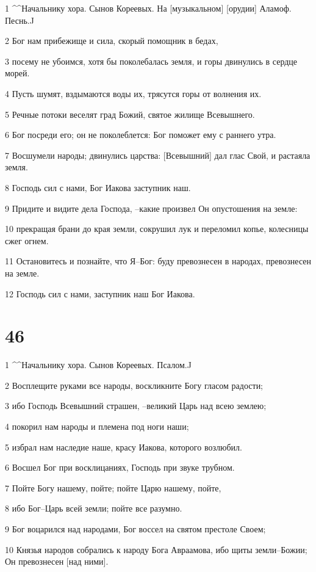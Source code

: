 \par 1 ^^Начальнику хора. Сынов Кореевых. На [музыкальном] [орудии] Аламоф. Песнь.^^
\par 2 Бог нам прибежище и сила, скорый помощник в бедах,
\par 3 посему не убоимся, хотя бы поколебалась земля, и горы двинулись в сердце морей.
\par 4 Пусть шумят, вздымаются воды их, трясутся горы от волнения их.
\par 5 Речные потоки веселят град Божий, святое жилище Всевышнего.
\par 6 Бог посреди его; он не поколеблется: Бог поможет ему с раннего утра.
\par 7 Восшумели народы; двинулись царства: [Всевышний] дал глас Свой, и растаяла земля.
\par 8 Господь сил с нами, Бог Иакова заступник наш.
\par 9 Придите и видите дела Господа, --какие произвел Он опустошения на земле:
\par 10 прекращая брани до края земли, сокрушил лук и переломил копье, колесницы сжег огнем.
\par 11 Остановитесь и познайте, что Я--Бог: буду превознесен в народах, превознесен на земле.
\par 12 Господь сил с нами, заступник наш Бог Иакова.

\chapter{46}

\par 1 ^^Начальнику хора. Сынов Кореевых. Псалом.^^
\par 2 Восплещите руками все народы, воскликните Богу гласом радости;
\par 3 ибо Господь Всевышний страшен, --великий Царь над всею землею;
\par 4 покорил нам народы и племена под ноги наши;
\par 5 избрал нам наследие наше, красу Иакова, которого возлюбил.
\par 6 Восшел Бог при восклицаниях, Господь при звуке трубном.
\par 7 Пойте Богу нашему, пойте; пойте Царю нашему, пойте,
\par 8 ибо Бог--Царь всей земли; пойте все разумно.
\par 9 Бог воцарился над народами, Бог воссел на святом престоле Своем;
\par 10 Князья народов собрались к народу Бога Авраамова, ибо щиты земли--Божии; Он превознесен [над ними].

